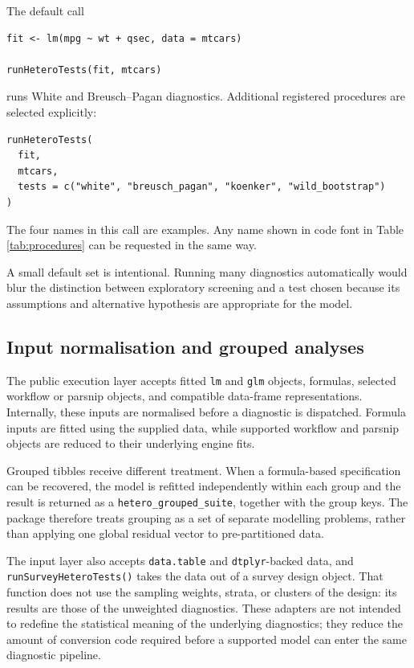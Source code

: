 The default call

\begin{verbatim}
fit <- lm(mpg ~ wt + qsec, data = mtcars)

runHeteroTests(fit, mtcars)
\end{verbatim}

runs White and Breusch--Pagan diagnostics. Additional registered procedures are
selected explicitly:

\begin{verbatim}
runHeteroTests(
  fit,
  mtcars,
  tests = c("white", "breusch_pagan", "koenker", "wild_bootstrap")
)
\end{verbatim}

The four names in this call are examples. Any name shown in code font in Table
\ref{tab:procedures} can be requested in the same way.

A small default set is intentional. Running many diagnostics automatically would
blur the distinction between exploratory screening and a test chosen because
its assumptions and alternative hypothesis are appropriate for the model.

\subsection{Input normalisation and grouped analyses}\label{input-normalisation-and-grouped-analyses}

The public execution layer accepts fitted \texttt{lm} and \texttt{glm} objects, formulas,
selected  workflow or parsnip objects, and compatible
data-frame representations. Internally, these inputs are normalised before a
diagnostic is dispatched. Formula inputs are fitted using the supplied data,
while supported workflow and parsnip objects are reduced to their underlying
engine fits.

Grouped tibbles receive different treatment. When a formula-based specification
can be recovered, the model is refitted independently within each group and the
result is returned as a \texttt{hetero\_grouped\_suite}, together with the group keys.
The package therefore treats grouping as a set of separate modelling problems,
rather than applying one global residual vector to pre-partitioned data.

The input layer also accepts \texttt{data.table} and \texttt{dtplyr}-backed data, and
\texttt{runSurveyHeteroTests()} takes the data out of a survey design object. That
function does not use the sampling weights, strata, or clusters of the design:
its results are those of the unweighted diagnostics. These adapters are not
intended to redefine the statistical meaning of the underlying diagnostics;
they reduce
the amount of conversion code required before a supported model can enter the
same diagnostic pipeline.

